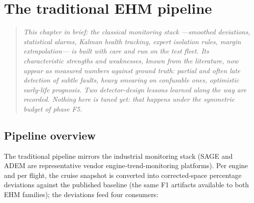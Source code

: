 \chapter{The traditional EHM pipeline}
\label{ch:trad}

\begin{quote}\itshape
This chapter in brief: the classical monitoring stack ---smoothed deviations, statistical
alarms, Kalman health tracking, expert isolation rules, margin extrapolation--- is built with
care and run on the test fleet. Its characteristic strengths and weaknesses, known from the
literature, now appear as measured numbers against ground truth: partial and often late
detection of subtle faults, heavy smearing on confusable ones, optimistic early-life
prognosis. Two detector-design
lessons learned along the way are recorded. Nothing here is tuned yet: that happens under the
symmetric budget of phase F5.
\end{quote}



\section{Pipeline overview}
\label{sec:trad-overview}

The traditional pipeline mirrors the industrial monitoring stack (SAGE and ADEM are
representative vendor engine-trend-monitoring platforms). Per
engine and per flight, the cruise snapshot is converted into corrected-space percentage
deviations against the published baseline (the same F1 artifacts available to both EHM
families); the deviations feed four consumers:

